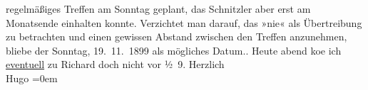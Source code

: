 \begin{ledgroupsized}[t]{13cm}
{{{                  regelmäßiges Treffen am Sonntag geplant, das Schnitzler aber erst am Monatsende einhalten konnte. Verzichtet man
                  darauf, das »nie« als Übertreibung zu betrachten und einen gewissen Abstand
                  zwischen den Treffen anzunehmen, bliebe der Sonntag, 19. 11. 1899 als
                  mögliches Datum.}}}\label{K_L00998_1h}.\pend
           \pstart
           Heute abend ko{\geminationm}e ich \uline{eventuell} zu Richard doch nicht vor
                  ½ 9.\pend
           \pstart
           Herzlich{\\[\baselineskip]}\spacefill\mbox{Hugo}\pend
           \leftskip=0em{}\endnumbering{}\end{ledgroupsized}  \newcommand{\dateiname}{L00998}\newcommand{\titel}{Hugo von Hofmannsthal an Arthur Schnitzler, [19. 11. 1899?]}\newcommand{\editorInnen}{Martin Anton Müller und Gerd-Hermann Susen}
      